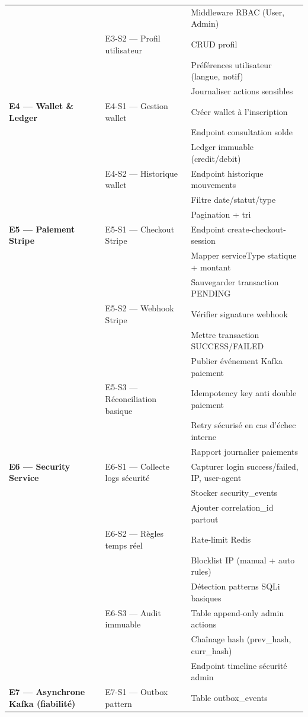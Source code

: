 \documentclass[12pt,a4paper]{report}
\begin{document}
\begin{longtable}{|p{3.5cm}|p{3.5cm}|p{9cm}|}
& & Middleware RBAC (User, Admin) \\
& E3-S2 — Profil utilisateur & CRUD profil \\
& & Préférences utilisateur (langue, notif) \\
& & Journaliser actions sensibles \\
\hline
\textbf{E4 — Wallet \& Ledger} & E4-S1 — Gestion wallet & Créer wallet à l'inscription \\
& & Endpoint consultation solde \\
& & Ledger immuable (credit/debit) \\
& E4-S2 — Historique wallet & Endpoint historique mouvements \\
& & Filtre date/statut/type \\
& & Pagination + tri \\
\hline
\textbf{E5 — Paiement Stripe} & E5-S1 — Checkout Stripe & Endpoint create-checkout-session \\
& & Mapper serviceType statique + montant \\
& & Sauvegarder transaction PENDING \\
& E5-S2 — Webhook Stripe & Vérifier signature webhook \\
& & Mettre transaction SUCCESS/FAILED \\
& & Publier événement Kafka paiement \\
& E5-S3 — Réconciliation basique & Idempotency key anti double paiement \\
& & Retry sécurisé en cas d'échec interne \\
& & Rapport journalier paiements \\
\hline
\textbf{E6 — Security Service} & E6-S1 — Collecte logs sécurité & Capturer login success/failed, IP, user-agent \\
& & Stocker security\_events \\
& & Ajouter correlation\_id partout \\
& E6-S2 — Règles temps réel & Rate-limit Redis \\
& & Blocklist IP (manual + auto rules) \\
& & Détection patterns SQLi basiques \\
& E6-S3 — Audit immuable & Table append-only admin actions \\
& & Chaînage hash (prev\_hash, curr\_hash) \\
& & Endpoint timeline sécurité admin \\
\hline
\textbf{E7 — Asynchrone Kafka (fiabilité)} & E7-S1 — Outbox pattern & Table outbox\_events \\

\end{longtable}
\end{document}

